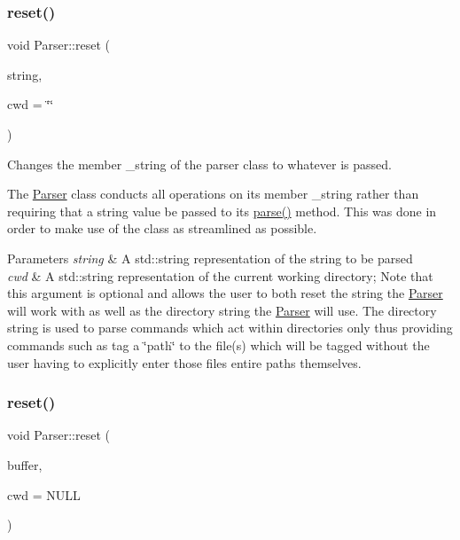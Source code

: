 \subsubsection{\texorpdfstring{reset()}{reset()}\hspace{0.1cm}{\footnotesize\ttfamily [1/3]}}
{\footnotesize\ttfamily void Parser\+::reset (\begin{DoxyParamCaption}\item[{std\+::string}]{string,  }\item[{std\+::string}]{cwd = {\ttfamily \char`\"{}\char`\"{}} }\end{DoxyParamCaption})}



Changes the member \+\_\+string of the parser class to whatever is passed. 

The \mbox{\hyperlink{class_parser}{Parser}} class conducts all operations on its member \+\_\+string rather than requiring that a string value be passed to its \mbox{\hyperlink{class_parser_a5b531e9ed867eeb8ccb9cb088cf35c24}{parse()}} method. This was done in order to make use of the class as streamlined as possible.


\begin{DoxyParams}{Parameters}
{\em string} & A std\+::string representation of the string to be parsed\\
\hline
{\em cwd} & A std\+::string representation of the current working directory; Note that this argument is optional and allows the user to both reset the string the \mbox{\hyperlink{class_parser}{Parser}} will work with as well as the directory string the \mbox{\hyperlink{class_parser}{Parser}} will use. The directory string is used to parse commands which act within directories only thus providing commands such as \textquotesingle{}tag\textquotesingle{} a \char`\"{}path\char`\"{} to the file(s) which will be tagged without the user having to explicitly enter those file\textquotesingle{}s entire paths themselves. \\
\hline
\end{DoxyParams}
\mbox{\label{class_parser_a5e097c301e171481e8d2af91c112e35e}} 
\subsubsection{\texorpdfstring{reset()}{reset()}\hspace{0.1cm}{\footnotesize\ttfamily [2/3]}}
{\footnotesize\ttfamily void Parser\+::reset (\begin{DoxyParamCaption}\item[{char $\ast$}]{buffer,  }\item[{char $\ast$}]{cwd = {\ttfamily NULL} }\end{DoxyParamCaption})}



